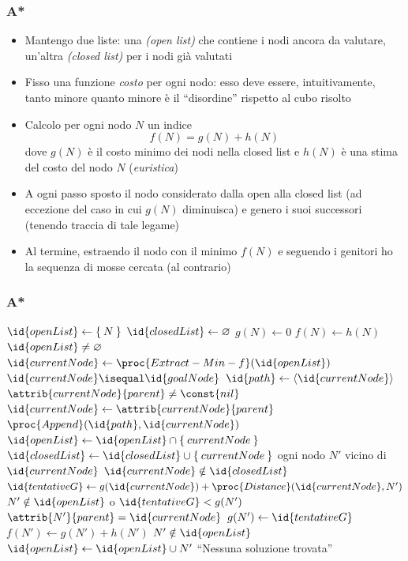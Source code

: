 \documentclass{beamer}
\renewcommand{\emptyset}{\varnothing}
\begin{document}
\begin{frame}
\frametitle{A*}
\begin{itemize}
\item Mantengo due liste: una \emph{(open list)} che contiene i nodi ancora da
valutare, un'altra \emph{(closed list)} per i nodi già valutati
\item Fisso una funzione \emph{costo} per ogni nodo: esso deve essere,
intuitivamente, tanto minore quanto minore è il ``disordine'' rispetto al cubo
risolto
\item Calcolo per ogni nodo $N$ un indice
\[
f(N) = g(N) + h(N)
\]
dove $g(N)$ è il costo minimo dei nodi nella closed list e $h(N)$ è una stima
del costo del nodo $N$ (\emph{euristica})
\item A ogni passo sposto il nodo considerato dalla open alla closed list (ad
eccezione del caso in cui $g(N)$ diminuisca) e genero i suoi successori
(tenendo traccia di tale legame)
\item Al termine, estraendo il nodo con il minimo $f(N)$ e seguendo i genitori
ho la sequenza di mosse cercata (al contrario)
\end{itemize}
\end{frame}

\begin{frame}
\frametitle{A*}
\tiny
\begin{codebox}
\li $\id{openList}\gets\Set{N}$
\li $\id{closedList}\gets\emptyset$
\li $g(N)\gets 0$
\li $f(N)\gets h(N)$
\li \While $\id{openList}\neq\emptyset$
\li     \Do
            $\id{currentNode}\gets\proc{Extract-Min-f}(\id{openList})$
\li         \If $\id{currentNode}\isequal\id{goalNode}$
\li         \Then
                $\id{path}\gets\Braket{\id{currentNode}}$
\li             \While $\attrib{currentNode}{parent}\neq\const{nil}$
\li             \Do
                    $\id{currentNode}\gets\attrib{currentNode}{parent}$
\li                 $\proc{Append}(\id{path}, \id{currentNode})$
                \End
\li             \Return {}
            \End
\li         $\id{openList}\gets\id{openList}\cap\Set{currentNode}$
\li         $\id{closedList}\gets\id{closedList}\cup\Set{currentNode}$
\li         \For ogni nodo $N'$ vicino di $\id{currentNode}$
\li         \Do
                \If $\id{currentNode}\notin\id{closedList}$
\li             \Then
                    $\id{tentativeG}\gets g(\id{currentNode}) +
\proc{Distance}(\id{currentNode}, N')$
\li                 \If $N'\notin\id{openList}$ o $\id{tentativeG} < g(N')$
\li                 \Then
                        $\attrib{N'}{parent} = \id{currentNode}$
\li                     $g(N')\gets\id{tentativeG}$
\li                     $f(N')\gets g(N') + h(N')$
\li                     \If $N'\notin\id{openList}$
\li                     \Then
                        $\id{openList}\gets\id{openList}\cup N'$
                        \End
                    \End
                \End
            \End
        \End
\li     \Error ``Nessuna soluzione trovata''
\end{codebox}
\end{frame}
\end{document}
